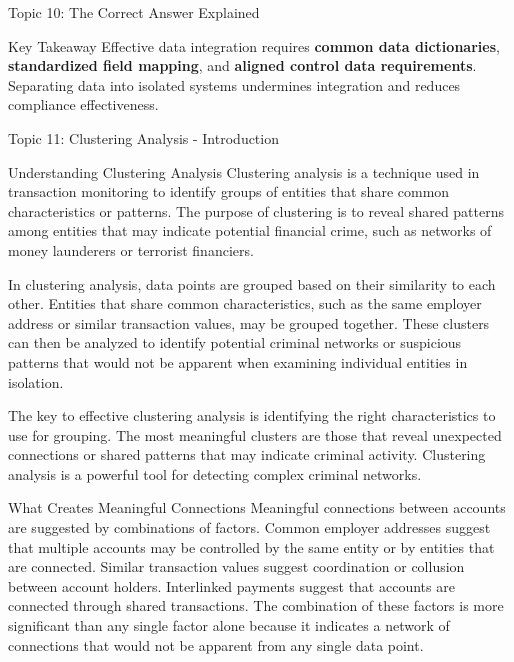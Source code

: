 \documentclass[8pt]{beamer}  %
\begin{document}
\begin{frame}{Topic 10: The Correct Answer Explained}
		\begin{alertblock}{Key Takeaway}
			Effective data integration requires \textbf{common data dictionaries}, \textbf{standardized field mapping}, and \textbf{aligned control data requirements}. Separating data into isolated systems undermines integration and reduces compliance effectiveness.
		\end{alertblock}
	\end{frame}
	
	\begin{frame}{Topic 11: Clustering Analysis - Introduction}
		\begin{block}{\large Understanding Clustering Analysis}
			Clustering analysis is a technique used in transaction monitoring to identify groups of entities that share common characteristics or patterns. The purpose of clustering is to reveal shared patterns among entities that may indicate potential financial crime, such as networks of money launderers or terrorist financiers.
			
			In clustering analysis, data points are grouped based on their similarity to each other. Entities that share common characteristics, such as the same employer address or similar transaction values, may be grouped together. These clusters can then be analyzed to identify potential criminal networks or suspicious patterns that would not be apparent when examining individual entities in isolation.
			
			The key to effective clustering analysis is identifying the right characteristics to use for grouping. The most meaningful clusters are those that reveal unexpected connections or shared patterns that may indicate criminal activity. Clustering analysis is a powerful tool for detecting complex criminal networks.
		\end{block}
		
		\vspace{0.2cm}
		\begin{block}{\large What Creates Meaningful Connections}
			Meaningful connections between accounts are suggested by combinations of factors. Common employer addresses suggest that multiple accounts may be controlled by the same entity or by entities that are connected. Similar transaction values suggest coordination or collusion between account holders. Interlinked payments suggest that accounts are connected through shared transactions. The combination of these factors is more significant than any single factor alone because it indicates a network of connections that would not be apparent from any single data point.
		\end{block}
	\end{frame}
	
\end{document}
